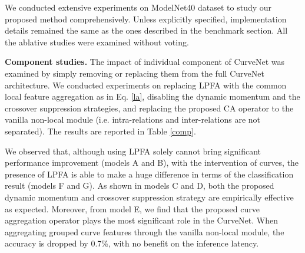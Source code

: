 \documentclass[10pt,twocolumn,letterpaper]{article}
\theoremstyle{definition}
\begin{document}
We conducted extensive experiments on ModelNet40 dataset to study our proposed method comprehensively. Unless explicitly specified, implementation details remained the same as the ones described in the benchmark section. All the ablative studies were examined without voting.


\noindent
\textbf{Component studies.} The impact of individual component of CurveNet was examined by simply removing or replacing them from the full CurveNet architecture. We conducted experiments on replacing LPFA with the common local feature aggregation as in Eq. \ref{la}, disabling the dynamic momentum and the crossover suppression strategies, and replacing the proposed CA operator to the vanilla non-local module (i.e. intra-relations and inter-relations are not separated). The results are reported in Table \ref{comp}. 

We observed that, although using LPFA solely cannot bring significant performance improvement (models A and B), with the intervention of curves, the presence of LPFA is able to make a huge difference in terms of the classification result (models F and G). As shown in models C and D, both the proposed dynamic momentum and crossover suppression strategy are empirically effective as expected. Moreover, from model E, we find that the proposed curve aggregation operator plays the most significant role in the CurveNet. When aggregating grouped curve features through the vanilla non-local module, the accuracy is dropped by 0.7\%, with no benefit on the inference latency.  
\end{document}
